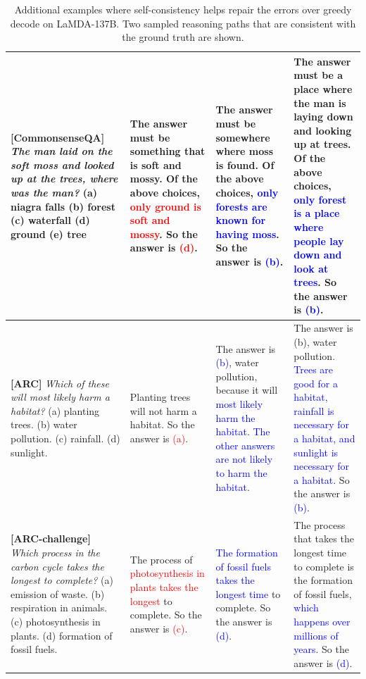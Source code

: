 \begin{table}[h]
\begin{tabular}{p{3.2cm} | p{3.1cm} | p{2.6cm} | p{3.3cm} }
         \midrule
        \textbf{[CommonsenseQA]} \textit{The man laid on the soft moss and looked up at the trees, where was the man?} (a) niagra falls (b) forest (c) waterfall (d) ground (e) tree
        & The answer must be something that is soft and mossy. Of the above choices, \textcolor{red}{only ground is soft and mossy}. So the answer is \textcolor{red}{(d)}.  
        & The answer must be somewhere where moss is found. Of the above choices, \textcolor{blue}{only forests are known for having moss}. So the answer is \textcolor{blue}{(b)}.  
        & The answer must be a place where the man is laying down and looking up at trees. Of the above choices, \textcolor{blue}{only forest is a place where people lay down and look at trees}. So the answer is \textcolor{blue}{(b)}.  \\
        \midrule
         \textbf{[ARC]} \textit{Which of these will most likely harm a habitat?}
         (a) planting trees. (b) water pollution. (c) rainfall. (d) sunlight.
        & Planting trees will not harm a habitat. So the answer is \textcolor{red}{(a)}.  
        & The answer is \textcolor{blue}{(b)}, water pollution, because it will \textcolor{blue}{most likely harm the habitat}. \textcolor{blue}{The other answers are not likely to harm the habitat}.
        & The answer is (b), water pollution. \textcolor{blue}{Trees are good for a habitat, rainfall is necessary for a habitat, and sunlight is necessary for a habitat.} So the answer is \textcolor{blue}{(b)}.  \\
        \midrule
         \textbf{[ARC-challenge]}
         \textit{Which process in the carbon cycle takes the longest to complete?} (a) emission of waste. (b) respiration in animals. (c) photosynthesis in plants. (d) formation of fossil fuels.
         & The process of \textcolor{red}{photosynthesis in plants takes the longest} to complete. So the answer is \textcolor{red}{(c)}.  
         & \textcolor{blue}{The formation of fossil fuels takes the longest time} to complete. So the answer is \textcolor{blue}{(d)}.  
         & The process that takes the longest time to complete is the formation of fossil fuels, \textcolor{blue}{which happens over millions of years}. So the answer is \textcolor{blue}{(d)}.  \\
         \bottomrule
    \end{tabular}
    \caption{Additional examples where self-consistency helps repair the errors over greedy decode on LaMDA-137B. Two sampled reasoning paths that are consistent with the ground truth are shown.}
    \label{tab:example_additional}
\end{table}

